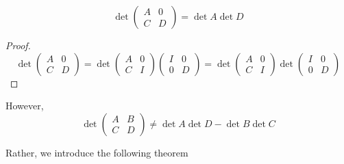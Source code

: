   \begin{corollary}
    \label{thm:determinant-of-a-block-triangular-matrix}
    \begin{equation}
      \det{\begin{pmatrix} A&0\\C&D \end{pmatrix}} = \det{A} \det{D}
    \end{equation}
  \end{corollary}
  \begin{proof}
    \begin{equation}
      \det{\begin{pmatrix}
      A&0\\C&D 
      \end{pmatrix}} = \det{\begin{pmatrix}
      A&0\\C&I
      \end{pmatrix} \begin{pmatrix}
      I&0\\0&D
      \end{pmatrix}} = \det{\begin{pmatrix}
      A&0\\C&I
      \end{pmatrix}} \det{\begin{pmatrix}
      I&0\\0&D
      \end{pmatrix}}
    \end{equation}
  \end{proof}

  However, 
  \begin{equation}
    \det{\begin{pmatrix} A&B\\C&D \end{pmatrix}} \neq \det{A} \det{D} - \det{B} \det{C}
  \end{equation}

  Rather, we introduce the following theorem

